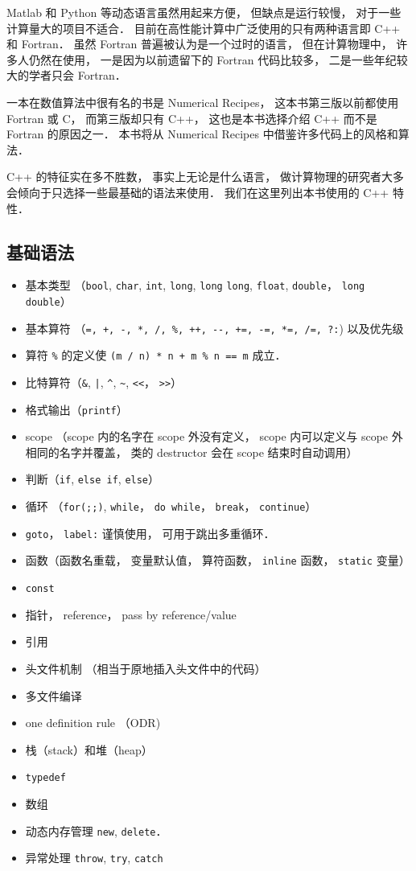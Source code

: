 
Matlab 和 Python 等动态语言虽然用起来方便， 但缺点是运行较慢， 对于一些计算量大的项目不适合． 目前在高性能计算中广泛使用的只有两种语言即 C++ 和 Fortran． 虽然 Fortran 普遍被认为是一个过时的语言， 但在计算物理中， 许多人仍然在使用， 一是因为以前遗留下的 Fortran 代码比较多， 二是一些年纪较大的学者只会 Fortran．

一本在数值算法中很有名的书是 Numerical Recipes， 这本书第三版以前都使用 Fortran 或 C， 而第三版却只有 C++， 这也是本书选择介绍 C++ 而不是 Fortran 的原因之一． 本书将从 Numerical Recipes 中借鉴许多代码上的风格和算法．

C++ 的特征实在多不胜数， 事实上无论是什么语言， 做计算物理的研究者大多会倾向于只选择一些最基础的语法来使用．
我们在这里列出本书使用的 C++ 特性．

\subsection{基础语法}
\begin{itemize}
\item 基本类型 （\verb|bool|, \verb|char|, \verb|int|, \verb|long|, \verb|long| \verb|long|, \verb|float|, \verb|double|， \verb|long double|）
\item 基本算符 （\verb|=, +, -, *, /, %, ++, --, +=, -=, *=, /=, ?:|) 以及优先级
\item 算符 \verb|%| 的定义使 \verb|(m / n) * n + m % n == m| 成立．
\item 比特算符（\verb|&|, \verb+|+, \verb|^|, \verb|~|, \verb|<<|， \verb|>>|）
\item 格式输出（\verb|printf|）
\item scope （scope 内的名字在 scope 外没有定义， scope 内可以定义与 scope 外相同的名字并覆盖， 类的 destructor 会在 scope 结束时自动调用）
\item 判断（\verb|if|, \verb|else if|, \verb|else|）
\item 循环 （\verb|for(;;)|, \verb|while|， \verb|do while|， \verb|break|， \verb|continue|）
\item \verb|goto|， \verb|label:| 谨慎使用， 可用于跳出多重循环．
\item 函数（函数名重载， 变量默认值， 算符函数， \verb|inline| 函数， \verb|static| 变量）
\item \verb|const|
\item 指针， reference， pass by reference/value
\item 引用
\item 头文件机制 （相当于原地插入头文件中的代码）
\item 多文件编译
\item one definition rule （ODR)
\item 栈（stack）和堆（heap）
\item \verb|typedef|
\item 数组
\item 动态内存管理 \verb|new|, \verb|delete|．
\item 异常处理 \verb|throw|, \verb|try|, \verb|catch|
\end{itemize}

